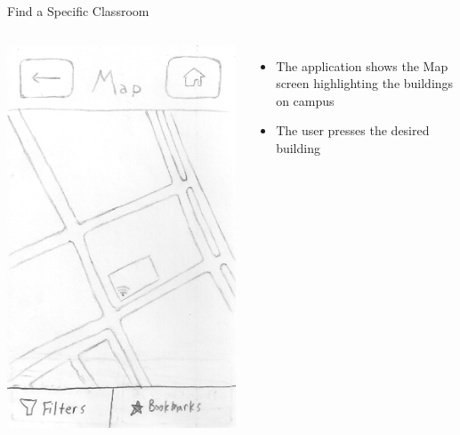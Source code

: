 \documentclass{beamer}
\begin{document}
\begin{frame}{Find a Specific Classroom}
    \begin{columns}[c]
        \center\includegraphics[height=0.75 \textheight]{hand-drawn/maps.png}
        \begin{itemize}
            \item The application shows the Map screen highlighting the buildings on campus
            \item The user presses the desired building
        \end{itemize}
    \end{columns}
\end{frame}
\end{document}
